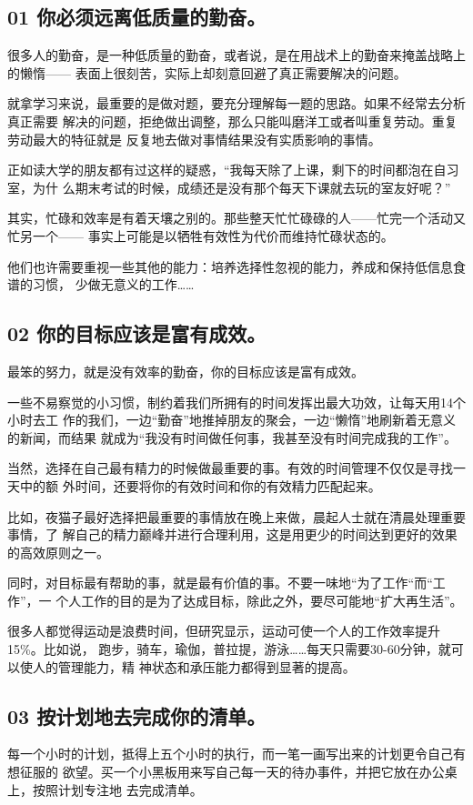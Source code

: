 \documentclass[11pt]{ctexart}
\begin{document}
{{{{\subsection{01 你必须远离低质量的勤奋。}
\label{sec:org671d487}
很多人的勤奋，是一种低质量的勤奋，或者说，是在用战术上的勤奋来掩盖战略上的懒惰——
表面上很刻苦，实际上却刻意回避了真正需要解决的问题。

就拿学习来说，最重要的是做对题，要充分理解每一题的思路。如果不经常去分析真正需要
解决的问题，拒绝做出调整，那么只能叫磨洋工或者叫重复劳动。重复劳动最大的特征就是
反复地去做对事情结果没有实质影响的事情。

正如读大学的朋友都有过这样的疑惑，“我每天除了上课，剩下的时间都泡在自习室，为什
么期末考试的时候，成绩还是没有那个每天下课就去玩的室友好呢？”

其实，忙碌和效率是有着天壤之别的。那些整天忙忙碌碌的人——忙完一个活动又忙另一个——
事实上可能是以牺牲有效性为代价而维持忙碌状态的。

他们也许需要重视一些其他的能力：培养选择性忽视的能力，养成和保持低信息食谱的习惯，
少做无意义的工作……

\subsection{02 你的目标应该是富有成效。}
\label{sec:org9321e84}
最笨的努力，就是没有效率的勤奋，你的目标应该是富有成效。

一些不易察觉的小习惯，制约着我们所拥有的时间发挥出最大功效，让每天用14个小时去工
作的我们，一边“勤奋”地推掉朋友的聚会，一边“懒惰”地刷新着无意义的新闻，而结果
就成为“我没有时间做任何事，我甚至没有时间完成我的工作”。

当然，选择在自己最有精力的时候做最重要的事。有效的时间管理不仅仅是寻找一天中的额
外时间，还要将你的有效时间和你的有效精力匹配起来。

比如，夜猫子最好选择把最重要的事情放在晚上来做，晨起人士就在清晨处理重要事情，了
解自己的精力巅峰并进行合理利用，这是用更少的时间达到更好的效果的高效原则之一。

同时，对目标最有帮助的事，就是最有价值的事。不要一味地“为了工作“而“工作”，一
个人工作的目的是为了达成目标，除此之外，要尽可能地“扩大再生活”。

很多人都觉得运动是浪费时间，但研究显示，运动可使一个人的工作效率提升15\%。比如说，
跑步，骑车，瑜伽，普拉提，游泳……每天只需要30-60分钟，就可以使人的管理能力，精
神状态和承压能力都得到显著的提高。

\subsection{03 按计划地去完成你的清单。}
\label{sec:org35815cf}
每一个小时的计划，抵得上五个小时的执行，而一笔一画写出来的计划更令自己有想征服的
欲望。买一个小黑板用来写自己每一天的待办事件，并把它放在办公桌上，按照计划专注地
去完成清单。

}}}}
\end{document}
